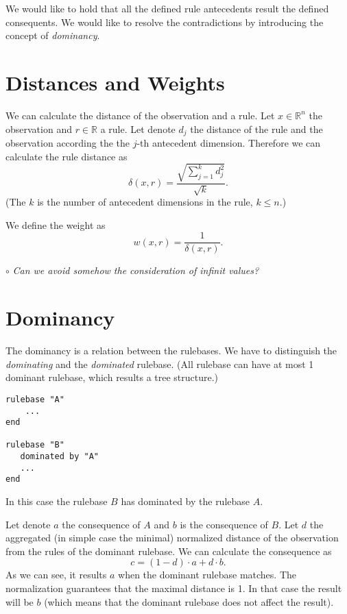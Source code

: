 \documentclass[a4paper,12pt]{article}
\newenvironment{question}[1]
{\noindent\textcolor{OliveGreen}{$\circ$ \textit{#1}}

\smallskip

\color{Gray}

}{\bigskip}
\begin{document}
We would like to hold that all the defined rule antecedents result the defined consequents. We would like to resolve the contradictions by introducing the concept of \textit{dominancy}.

\section{Distances and Weights}

We can calculate the distance of the observation and a rule. Let $x \in \mathbb{R}^n$ the observation and $r \in \mathbb{R}$ a rule. Let denote $d_j$ the distance of the rule and the observation according the the $j$-th antecedent dimension. Therefore we can calculate the rule distance as
$$
\delta(x, r) =
\dfrac{
	\sqrt{\displaystyle \sum_{j=1}^{k} d_{j}^{2}}
}{
	\sqrt{k}
}.
$$
(The $k$ is the number of antecedent dimensions in the rule, $k \leq n$.)

We define the weight as
$$
w(x, r) = \dfrac{1}{\delta(x, r)}.
$$

\begin{question}{Can we avoid somehow the consideration of infinit values?}
\end{question}

\section{Dominancy}

The dominancy is a relation between the rulebases. We have to distinguish the \textit{dominating} and the \textit{dominated} rulebase. (All rulebase can have at most 1 dominant rulebase, which results a tree structure.)

\begin{verbatim}
rulebase "A"
    ...
end

rulebase "B"
   dominated by "A"
   ...
end
\end{verbatim}

In this case the rulebase $B$ has dominated by the rulebase $A$.

Let denote $a$ the consequence of $A$ and $b$ is the consequence of $B$. Let $d$ the aggregated (in simple case the minimal) normalized distance of the observation from the rules of the dominant rulebase. We can calculate the consequence as
$$
c = (1 - d) \cdot a + d \cdot b.
$$
As we can see, it results $a$ when the dominant rulebase matches. The normalization guarantees that the maximal distance is 1. In that case the result will be $b$ (which means that the dominant rulebase does not affect the result).
\end{document}
